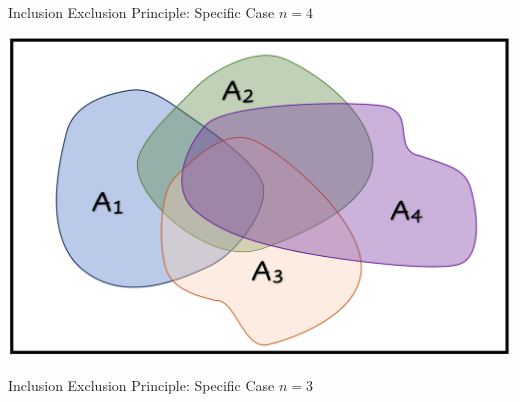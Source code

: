 \documentclass[compress]{beamer}
\begin{document}
\begin{frame}{Inclusion Exclusion Principle: Specific Case  $n=4$}
\begin{center}
\includegraphics[scale=.3]{figs/InclusionExclusion4.png}
\end{center}

	\vspace{1in}
\end{frame}

\begin{frame}{Inclusion Exclusion Principle: Specific Case  $n=3$}


\end{frame}


\begin{frame}

\end{frame}
\end{document}
